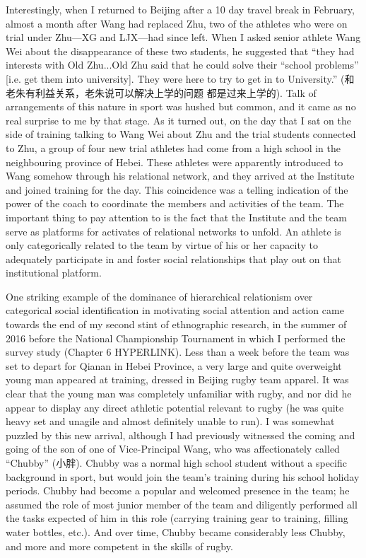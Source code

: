 \begin{CJK}{UTF8}{gbsn}
Interestingly, when I returned to Beijing after a 10 day travel break in February, almost a month after Wang had replaced Zhu, two of the athletes who were on trial under Zhu---XG and LJX---had since left.  When I asked senior athlete Wang Wei about the disappearance of these two students, he suggested that ``they had interests with Old Zhu...Old Zhu said that he could solve their ``school problems'' [i.e. get them into university]. They were here to try to get in to University.'' (和老朱有利益关系，老朱说可以解决上学的问题 都是过来上学的). Talk of arrangements of this nature in sport was hushed but common, and it came as no real surprise to me by that stage.  As it turned out, on the day that I sat on the side of training talking to Wang Wei about Zhu and the trial students connected to Zhu, a group of four new trial athletes had come from a high school in the neighbouring province of Hebei.  These athletes were apparently introduced to Wang somehow through his relational network, and they arrived at the Institute and joined training for the day. This coincidence was a telling indication of the power of the coach to coordinate the members and activities of the team. The important thing to pay attention to is the fact that the Institute and the team serve as platforms for activates of relational networks to unfold. An athlete is only categorically related to the team by virtue of his or her capacity to adequately participate in and foster social relationships that play out on that institutional platform.

One striking example of the dominance of hierarchical relationism over categorical social identification in motivating social attention and action came towards the end of my second stint of ethnographic research, in the summer of 2016 before the National Championship Tournament in which I performed the survey study (Chapter 6 HYPERLINK).  Less than a week before the team was set to depart for Qianan in Hebei Province, a very large and quite overweight young man appeared at training, dressed in Beijing rugby team apparel.  It was clear that the young man was completely unfamiliar with rugby, and nor did he appear to display any direct athletic potential relevant to rugby (he was quite heavy set and unagile and almost definitely unable to run).  I was somewhat puzzled by this new arrival, although I had previously witnessed the coming and going of the son of one of Vice-Principal Wang, who was affectionately called ``Chubby'' (小胖).
Chubby was a normal high school student without a specific background in sport, but would join the team's training during his school holiday periods.  Chubby had become a popular and welcomed presence in the team; he assumed the role of most junior member of the team and diligently performed all the tasks expected of him in this role (carrying training gear to training, filling water bottles, etc.).  And over time, Chubby became considerably less Chubby, and more and more competent in the skills of rugby.


\end{CJK}
